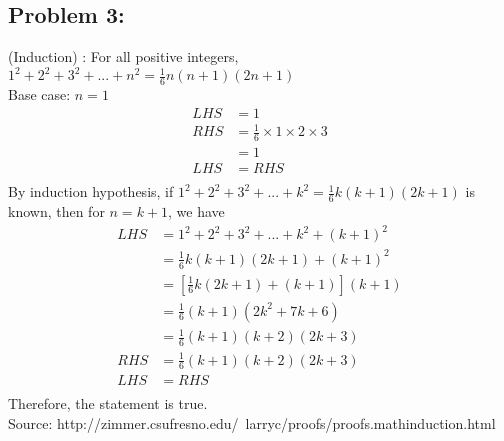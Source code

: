 \documentclass{article}
\begin{document}
\subsection*{{Problem 3: }}
(Induction) : For all positive integers, $1^2 + 2^2 + 3^2 + ... + n^2 = \frac{1}{6}n(n+1)(2n+1) $ \\
Base case: $n=1$  
\begin{align*} 
LHS &= 1 \\
RHS &=  \frac{1}{6}\times 1 \times 2 \times 3 \\
&= 1 \\
LHS &= RHS \\
\end{align*}	
By induction hypothesis, if $1^2 + 2^2 + 3^2 + ... + k^2 = \frac{1}{6}k(k+1)(2k+1) $ is known, then for $n= k+1$, we have 
\begin{align*} 
LHS & = 1^2 + 2^2 + 3^2 + ... + k^2 + (k+1)^2 \\
& = \frac{1}{6}k(k+1)(2k+1) + (k+1)^2 \\
& = [\frac{1}{6}k(2k+1)+(k+1)](k+1) \\
& =  \frac{1}{6}(k+1)(2k^2+7k+6) \\
& = \frac{1}{6}(k+1)(k+2)(2k+3)  \\
RHS &= \frac{1}{6}(k+1)(k+2)(2k+3) \\
LHS &= RHS \\
\end{align*}
Therefore, the statement is true. \\
Source: http://zimmer.csufresno.edu/~larryc/proofs/proofs.mathinduction.html
\hypertarget{}{}
\end{document}
